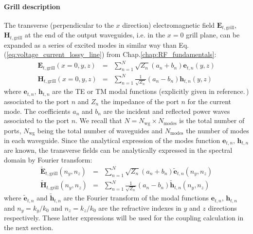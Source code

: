 
\paragraph{Grill description}
The transverse (perpendicular to the $x$ direction) electromagnetic field $\mathbf{E}_{t,\mbox{grill}}$, $\mathbf{H}_{t,\mbox{grill}}$ at the end of the output waveguides, i.e. in the $x=0$ grill plane, can be expanded as a series of excited modes in similar way than Eq.(\ref{eq:voltage_current_lossy_line}) from Chap.\ref{chap:RF_fundamentals}:
\begin{eqnarray}
\mathbf{E}_{t,\mbox{grill}}(x=0,y,z) & = & \sum_{n=1}^{N}\sqrt{Z_{n}}\left(a_{n}+b_{n}\right)\mathbf{e}_{t,n}(y,z)\\
\mathbf{H}_{t,\mbox{grill}}(x=0,y,z) & = & \sum_{n=1}^{N}\frac{1}{\sqrt{Z_{n}}}\left(a_{n}-b_{n}\right)\mathbf{h}_{t,n}(y,z)
\end{eqnarray}
where $\mathbf{e}_{t,n},\,\mathbf{h}_{t,n}$ are the TE or TM modal functions (explicitly given in reference.\,\cite{Harrington2001}) associated to the port $n$ and $Z_{n}$ the impedance of the port $n$ for the current mode. The coefficients $a_{n}$ and $b_{n}$ are the incident and reflected power waves associated to the port $n$. We recall that $N=N_{\mbox{wg}}\times N_{\mbox{modes}}$ is the total number of ports, $N_{\mbox{wg}}$ being the total number of waveguides and $N_{\mbox{modes}}$ the number of modes in each waveguide. Since the analytical expression of the modes function $\mathbf{e}_{t,n},\,\mathbf{h}_{t,n}$ are known, the transverse fields can be analytically expressed in the spectral domain by Fourier transform:
\begin{eqnarray}
\mathbf{\tilde{E}}_{t,\mbox{grill}}\left(n_{y},n_{z}\right) & = & \sum_{n=1}^{N}\sqrt{Z_{n}}\left(a_{n}+b_{n}\right)\mathbf{\tilde{e}}_{t,n}\left(n_{y},n_{z}\right)\label{eq:E_grill_spectral}\\
\tilde{\mathbf{H}}_{t,\mbox{grill}}\left(n_{y},n_{z}\right) & = & \sum_{n=1}^{N}\frac{1}{\sqrt{Z_{n}}}\left(a_{n}-b_{n}\right)\tilde{\mathbf{h}}_{t,n}\left(n_{y},n_{z}\right)\label{eq:H_grill_spectral}\end{eqnarray}
where $\mathbf{\tilde{e}}_{t,n}$ and $\mathbf{\tilde{h}}_{t,n}$ are the Fourier transform of the modal functions $\mathbf{e}_{t,n},\,\mathbf{h}_{t,n}$ and $n_{y}=k_{y}/k_{0}$ and $n_{z}=k_{z}/k_{0}$ are the refractive indexes in $y$ and $z$ directions respectively. These latter expressions will be used for the coupling calculation in the next section.


